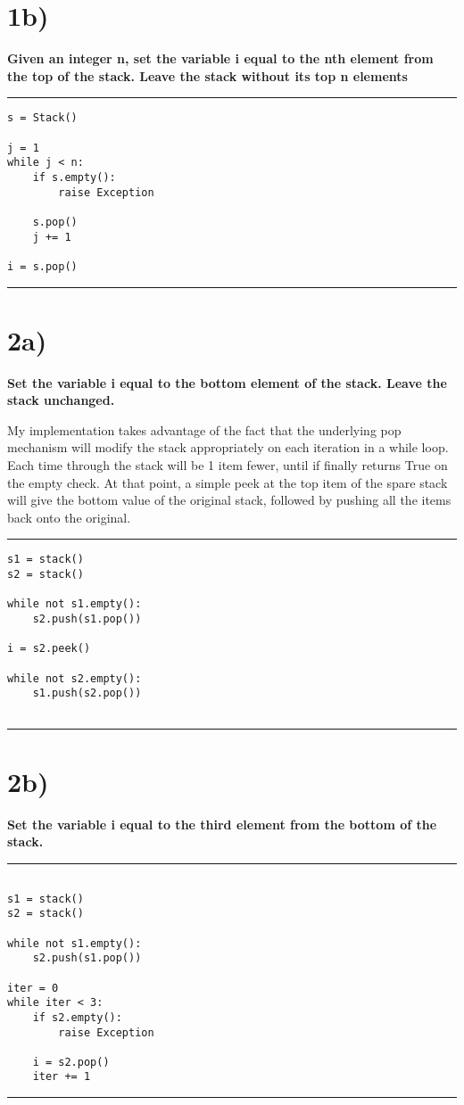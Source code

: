 \documentclass[a4paper,11pt]{article}
\begin{document}
\section*{1b)}
{\bf Given an integer n, set the variable i equal to the nth element from the top of the stack.  Leave the stack without its top n elements}

\noindent\rule{\linewidth}{0.1pt}
\begin{verbatim}
s = Stack()

j = 1
while j < n:
    if s.empty():
        raise Exception
        
    s.pop()
    j += 1
    
i = s.pop()
\end{verbatim}
\noindent\rule{\linewidth}{0.1pt}


\section*{2a)}
{\bf Set the variable i equal to the bottom element of the stack. Leave the stack unchanged. }

My implementation takes advantage of the fact that the underlying pop mechanism will modify the stack appropriately
on each iteration in a while loop.  Each time through the stack will be 1 item fewer, until if finally returns True on the empty check.  At that point, a simple peek at the top item of the spare stack will give the bottom value of the original stack, followed by pushing all the items back onto the original.

\noindent\rule{\linewidth}{0.1pt}
\begin{verbatim}
s1 = stack()
s2 = stack()

while not s1.empty():
    s2.push(s1.pop())
    
i = s2.peek()

while not s2.empty():
    s1.push(s2.pop())
    
\end{verbatim}
\noindent\rule{\linewidth}{0.1pt}

\section*{2b)}
{\bf Set the variable i equal to the third element from the bottom of the stack.}

\noindent\rule{\linewidth}{0.1pt}
\begin{verbatim}

s1 = stack()
s2 = stack()

while not s1.empty():
    s2.push(s1.pop())

iter = 0
while iter < 3:
    if s2.empty():
        raise Exception
     
    i = s2.pop()
    iter += 1
\end{verbatim}
\noindent\rule{\linewidth}{0.1pt}
\end{document}
